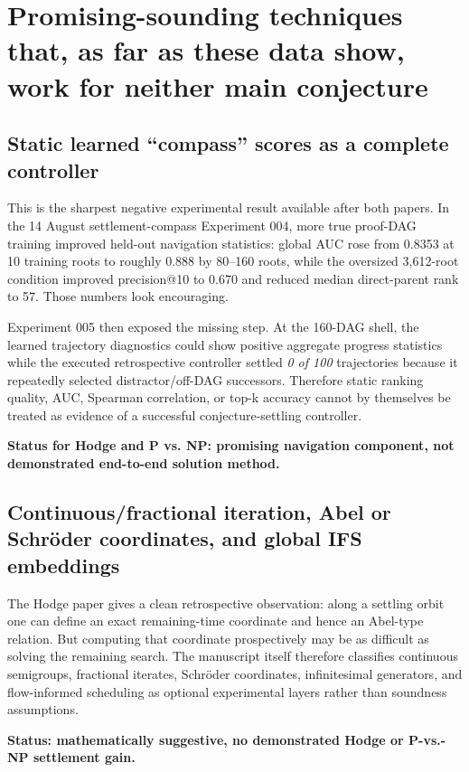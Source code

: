 \documentclass[11pt]{article}
\begin{document}
\section{Promising-sounding techniques that, as far as these data show, work for neither main conjecture}

\subsection{Static learned ``compass'' scores as a complete controller}

This is the sharpest negative experimental result available after both papers.  In the 14 August settlement-compass Experiment 004, more true proof-DAG training improved held-out navigation statistics: global AUC rose from 0.8353 at 10 training roots to roughly 0.888 by 80--160 roots, while the oversized 3,612-root condition improved precision@10 to 0.670 and reduced median direct-parent rank to 57.  Those numbers look encouraging.

Experiment 005 then exposed the missing step.  At the 160-DAG shell, the learned trajectory diagnostics could show positive aggregate progress statistics while the executed retrospective controller settled \emph{0 of 100} trajectories because it repeatedly selected distractor/off-DAG successors.  Therefore static ranking quality, AUC, Spearman correlation, or top-k accuracy cannot by themselves be treated as evidence of a successful conjecture-settling controller.

\textbf{Status for Hodge and P vs. NP: promising navigation component, not demonstrated end-to-end solution method.}

\subsection{Continuous/fractional iteration, Abel or Schröder coordinates, and global IFS embeddings}

The Hodge paper gives a clean retrospective observation: along a settling orbit one can define an exact remaining-time coordinate and hence an Abel-type relation.  But computing that coordinate prospectively may be as difficult as solving the remaining search.  The manuscript itself therefore classifies continuous semigroups, fractional iterates, Schröder coordinates, infinitesimal generators, and flow-informed scheduling as optional experimental layers rather than soundness assumptions.

\textbf{Status: mathematically suggestive, no demonstrated Hodge or P-vs.-NP settlement gain.}
\end{document}
